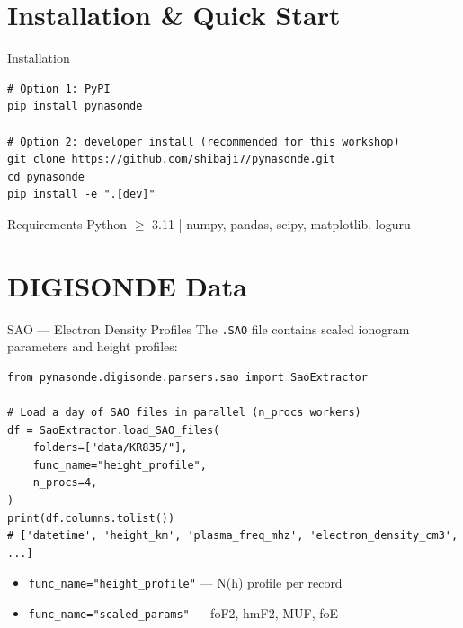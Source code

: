 \documentclass[aspectratio=169,11pt]{beamer}
\begin{document}
\section{Installation \& Quick Start}

\begin{frame}[fragile]{Installation}
  \begin{lstlisting}[title={Terminal}]
# Option 1: PyPI
pip install pynasonde

# Option 2: developer install (recommended for this workshop)
git clone https://github.com/shibaji7/pynasonde.git
cd pynasonde
pip install -e ".[dev]"
  \end{lstlisting}

  \begin{block}{Requirements}
    Python $\ge$ 3.11 \quad|\quad
    numpy, pandas, scipy, matplotlib, loguru
  \end{block}
\end{frame}

\section{DIGISONDE Data}

\begin{frame}[fragile]{SAO — Electron Density Profiles}
  The \texttt{.SAO} file contains scaled ionogram parameters and height profiles:
  \begin{lstlisting}
from pynasonde.digisonde.parsers.sao import SaoExtractor

# Load a day of SAO files in parallel (n_procs workers)
df = SaoExtractor.load_SAO_files(
    folders=["data/KR835/"],
    func_name="height_profile",
    n_procs=4,
)
print(df.columns.tolist())
# ['datetime', 'height_km', 'plasma_freq_mhz', 'electron_density_cm3', ...]
  \end{lstlisting}
  \begin{itemize}\small
    \item \texttt{func\_name="height\_profile"} — N(h) profile per record
    \item \texttt{func\_name="scaled\_params"} — foF2, hmF2, MUF, foE
  \end{itemize}
\end{frame}
\end{document}
